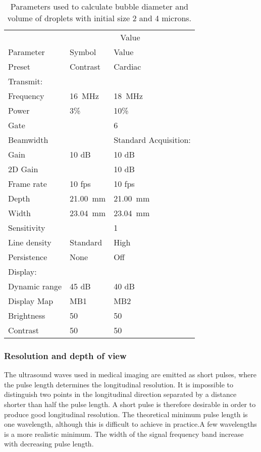 \begin{table}[htb]
	\caption{Parameters used to calculate bubble diameter and volume of droplets with initial size 2 and 4 microns.}
	\label{tab:growth parameters}
	\begin{center}
		\begin{tabular}{@{}l l l @{}}\toprule
			& \multicolumn{2}{c}{Value} \\ \cmidrule(r){2-3}
			Parameter & Symbol & Value\\
			\midrule
			Preset & Contrast & Cardiac\\
			Transmit:\\
			Frequency & \SI{16}{\mega\hertz} & \SI{18}{\mega\hertz}\\
			Power & 3\% & 10\%\\
			Gate & & 6\\
			Beamwidth & & Standard
			Acquisition:\\
			Gain & 10 dB & 10 dB\\
			2D Gain & & 10 dB\\  
			Frame rate & 10 fps & 10 fps\\
			Depth & \SI{21.00}{\milli\meter} & \SI{21.00}{\milli\meter}\\
			Width & \SI{23.04}{\milli\meter} & \SI{23.04}{\milli\meter}\\
			Sensitivity & &1\\
			Line density & Standard & High \\ 
			Persistence & None & Off \\
			Display:\\
			Dynamic range &45 dB &40 dB \\
			Display Map & MB1 & MB2\\
			Brightness & 50 & 50\\
			Contrast & 50 & 50 \\
			\bottomrule
		\end{tabular}
	\end{center}
\end{table}

   
\subsubsection{Resolution and depth of view}
The ultrasound waves used in medical imaging are emitted as short pulses, where the pulse length determines the longitudinal resolution. It is impossible to distinguish two points in the longitudinal direction separated by a distance shorter than half the pulse length. A short pulse is therefore desirable in order to produce good longitudinal resolution. The theoretical minimum pulse length is one wavelength, although this is difficult to achieve in practice.A few wavelengths is a more realistic minimum. The width of the signal frequency band increase with decreasing pulse length. 

